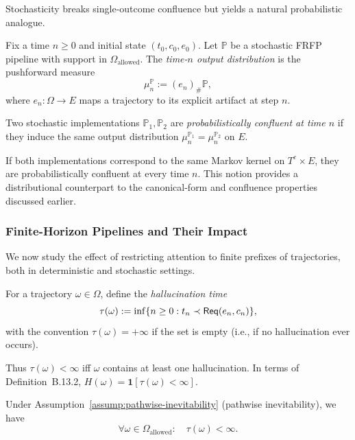 Stochasticity breaks single-outcome confluence but yields a natural
probabilistic analogue.

\begin{definition}
Fix a time \(n\ge 0\) and initial state \((t_0,c_0,e_0)\). Let
\(\mathbb{P}\) be a stochastic FRFP pipeline with support in
\(\Omega_{\mathrm{allowed}}\). The \emph{time-\(n\) output
distribution} is the pushforward measure
\[
\mu_n^{\mathbb{P}} := (e_n)_\# \mathbb{P},
\]
where \(e_n:\Omega\to E\) maps a trajectory to its explicit artifact at
step \(n\).

Two stochastic implementations \(\mathbb{P}_1,\mathbb{P}_2\) are
\emph{probabilistically confluent at time \(n\)} if they induce the same
output distribution \(\mu_n^{\mathbb{P}_1}=\mu_n^{\mathbb{P}_2}\) on
\(E\).
\end{definition}

If both implementations correspond to the same Markov kernel on
\(T^e\times E\), they are probabilistically confluent at every time
\(n\). This notion provides a distributional counterpart to the
canonical-form and confluence properties discussed earlier.

\subsubsection{Finite-Horizon Pipelines and Their Impact}

We now study the effect of restricting attention to finite prefixes of
trajectories, both in deterministic and stochastic settings.


\begin{definition}
For a trajectory \(\omega\in\Omega\), define the \emph{hallucination
time}
\[
\tau(\omega)
 :=
 \inf\{ n \ge 0 : t_n \prec \mathsf{Req}(e_n,c_n) \},
\]
with the convention \(\tau(\omega)=+\infty\) if the set is empty (i.e.,
if no hallucination ever occurs).
\end{definition}

Thus \(\tau(\omega) < \infty\) iff \(\omega\) contains at least one
hallucination. In terms of Definition~B.13.2, \(H(\omega) =
\mathbf{1}[\tau(\omega) < \infty]\).

\begin{lemma}
Under Assumption~\ref{assump:pathwise-inevitability} (pathwise
inevitability), we have
\[
\forall \omega \in \Omega_{\mathrm{allowed}}:\quad \tau(\omega) < \infty.
\]
\end{lemma}

